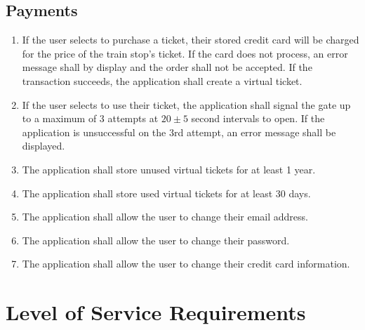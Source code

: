 \documentclass[titlepage]{article}
\begin{document}
	\subsection{Payments}\begin{enumerate}
		\item If the user selects to purchase a ticket, their stored credit card will be charged for the price of the train stop’s ticket. If the card does not process, an error message shall by display and the order shall not be accepted. If the transaction succeeds, the application shall create a virtual ticket.
		\item If the user selects to use their ticket, the application shall signal the gate up to a maximum of 3 attempts at $20\pm 5$ second intervals to open. If the application is unsuccessful on the 3rd attempt, an error message shall be displayed.
		\item The application shall store unused virtual tickets for at least 1 year.
		\item The application shall store used virtual tickets for at least 30 days.
		\item The application shall allow the user to change their email address.
		\item The application shall allow the user to change their password.
		\item The application shall allow the user to change their credit card information.
	\end{enumerate}		
\newpage	
\section{Level of Service Requirements}
\end{document}

